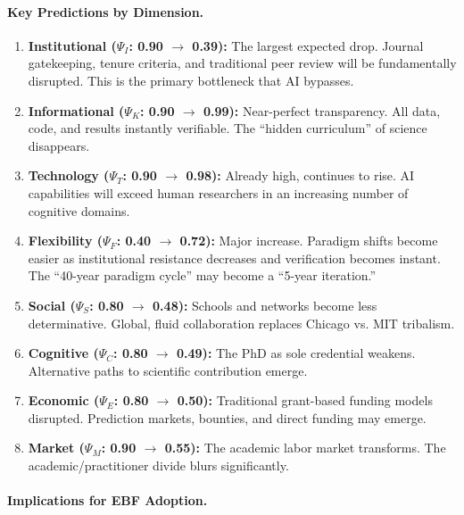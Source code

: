 \paragraph{Key Predictions by Dimension.}

\begin{enumerate}[nosep]
    \item \textbf{Institutional ($\Psi_I$: 0.90 $\to$ 0.39):} The largest expected drop.
        Journal gatekeeping, tenure criteria, and traditional peer review will be
        fundamentally disrupted. This is the primary bottleneck that AI bypasses.

    \item \textbf{Informational ($\Psi_K$: 0.90 $\to$ 0.99):} Near-perfect transparency.
        All data, code, and results instantly verifiable. The ``hidden curriculum''
        of science disappears.

    \item \textbf{Technology ($\Psi_T$: 0.90 $\to$ 0.98):} Already high, continues to rise.
        AI capabilities will exceed human researchers in an increasing number of
        cognitive domains.

    \item \textbf{Flexibility ($\Psi_F$: 0.40 $\to$ 0.72):} Major increase. Paradigm
        shifts become easier as institutional resistance decreases and verification
        becomes instant. The ``40-year paradigm cycle'' may become a ``5-year iteration.''

    \item \textbf{Social ($\Psi_S$: 0.80 $\to$ 0.48):} Schools and networks become
        less determinative. Global, fluid collaboration replaces Chicago vs. MIT
        tribalism.

    \item \textbf{Cognitive ($\Psi_C$: 0.80 $\to$ 0.49):} The PhD as sole credential
        weakens. Alternative paths to scientific contribution emerge.

    \item \textbf{Economic ($\Psi_E$: 0.80 $\to$ 0.50):} Traditional grant-based funding
        models disrupted. Prediction markets, bounties, and direct funding may emerge.

    \item \textbf{Market ($\Psi_M$: 0.90 $\to$ 0.55):} The academic labor market transforms.
        The academic/practitioner divide blurs significantly.
\end{enumerate}

\paragraph{Implications for EBF Adoption.}

